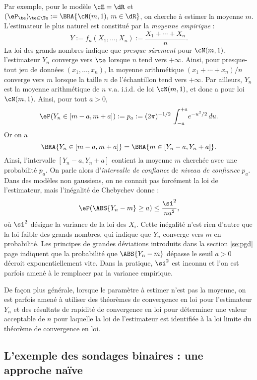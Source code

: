 Par exemple, pour le modèle $\cE=\dR$ et
$(\eP_\te)_{\te\in\Te}:=\BRA{\cN(m,1),\,m\in\dR}$, on cherche à estimer la moyenne
$m$. L'estimateur le plus naturel est constitué par la \emph{moyenne
  empirique} :
$$
Y:=f_n(X_1,\ldots,X_n):=\frac{X_1+\cdots+X_n}{n}.
$$
La loi des grands nombres indique que \emph{presque-sûrement} pour
$\cN(m,1)$, l'estimateur $Y_n$ converge vers $\te$ lorsque $n$ tend vers $+\infty$.
Ainsi, pour presque-tout jeu de données $(x_1,\ldots,x_n)$, la moyenne arithmétique
$(x_1+\cdots+x_n)/n$ converge vers $m$ lorsque la taille $n$ de l'échantillon tend
vers $+\infty$.  Par ailleurs, $Y_n$ est la moyenne arithmétique de $n$ v.a. i.i.d.
de loi $\cN(m,1)$, et donc a pour loi $\cN(m,1)$. Ainsi, pour tout $a>0$,
$$
\eP(Y_n\in [m-a,m+a]):=p_a:=(2\pi)^{-1/2}\,\int_{-a}^{+a}\!e^{-u^2/2}\,du.
$$
Or on a
$$
\BRA{Y_n\in [m-a,m+a]}=\BRA{m\in[Y_n-a,Y_n+a]}.
$$
Ainsi, l'intervalle $[Y_n-a,Y_n+a]$ contient la moyenne $m$ cherchée avec
une probabilité $p_a$. On parle alors d'\emph{intervalle de confiance} de
\emph{niveau de confiance} $p_a$. Dans des modèles non gaussiens, on ne
connait pas forcément la loi de l'estimateur, mais l'inégalité de Chebychev
donne :
$$
\eP(\ABS{Y_n-m} \geq a) \leq \frac{\si^2}{na^2},
$$
où $\si^2$ désigne la variance de la loi des $X_i$. Cette inégalité n'est
rien d'autre que la loi faible des grands nombres, qui indique que $Y_n$
converge vers $m$ en probabilité. Les principes de grandes déviations
introduits dans la section \ref{se:pgd} page \pageref{se:pgd} indiquent que la
probabilité que $\ABS{Y_n-m}$ dépasse le seuil $a>0$ décroit exponentiellement
vite. Dans la pratique, $\si^2$ est inconnu et l'on est parfois amené à le
remplacer par la variance empirique.

De façon plus générale, lorsque le paramètre à estimer n'est pas la moyenne,
on est parfois amené à utiliser des théorèmes de convergence en loi pour
l'estimateur $Y_n$ et des résultats de rapidité de convergence en loi pour
déterminer une valeur acceptable de $n$ pour laquelle la loi de l'estimateur
est identifiée à la loi limite du théorème de convergence en loi.

\subsection{L'exemple des sondages binaires : une approche naïve}

